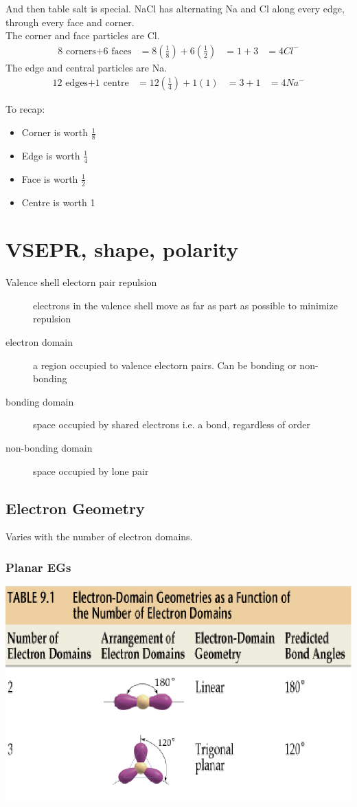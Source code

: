 \documentclass[a4paper, 8pt]{memoir}
\begin{document}
And then table salt is special. NaCl has alternating Na and Cl along every edge, through every face and corner. \\
The corner and face particles are Cl.
\begin{align*}
\text{8 corners} + \text{6 faces} &= 8(\frac{1}{8}) + 6(\frac{1}{2})
&= 1 + 3
&= 4 Cl^{-}
\end{align*}
The edge and central particles are Na.
\begin{align*}
\text{12 edges} + \text{1 centre} &= 12(\frac{1}{4}) + 1(1)
&= 3 + 1
&= 4 Na^{-}
\end{align*}

To recap:
\begin{itemize}
\item Corner is worth $\frac{1}{8}$
\item Edge is worth $\frac{1}{4}$
\item Face is worth $\frac{1}{2}$
\item Centre is worth 1
\end{itemize}

\chapter{VSEPR, shape, polarity}
\begin{description}
\item[Valence shell electorn pair repulsion] electrons in the valence shell move as far as part as possible to minimize repulsion
\item[electron domain] a region occupied to valence electorn pairs. Can be bonding or non-bonding
\item[bonding domain] space occupied by shared electrons i.e. a bond, regardless of order
\item[non-bonding domain] space occupied by lone pair
\end{description}
\section{Electron Geometry}
Varies with the number of electron domains.
\subsection {Planar EGs}
\includegraphics[scale=0.4]{planarElectronGeos}
\end{document}
